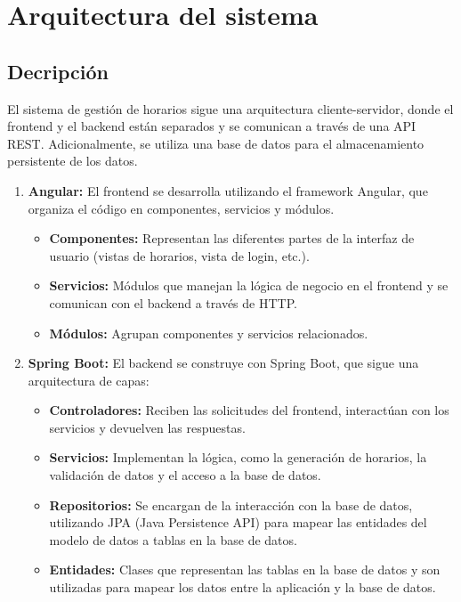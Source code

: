 \documentclass{article} %
\begin{document}
    \section{Arquitectura del sistema}
    \subsection{Decripción}
    \noindent El sistema de gestión de horarios sigue una arquitectura cliente-servidor, donde el frontend y el backend están separados y se comunican a través de una API REST. Adicionalmente, se utiliza una base de datos para el almacenamiento persistente de los datos.
    
    \begin{enumerate}[font=\bfseries]
            \item \textbf{Angular:} El frontend se desarrolla utilizando el framework Angular, que organiza el código en componentes, servicios y módulos.            
            \begin{itemize}
                \item \textbf{Componentes:} Representan las diferentes partes de la interfaz de usuario (vistas de horarios, vista de login, etc.).
                \item \textbf{Servicios:} Módulos que manejan la lógica de negocio en el frontend y se comunican con el backend a través de HTTP.
                \item \textbf{Módulos:} Agrupan componentes y servicios relacionados.
            \end{itemize}
        
            \item \textbf{Spring Boot:} El backend se construye con Spring Boot, que sigue una arquitectura de capas:
            \begin{itemize}
                \item \textbf{Controladores:} Reciben las solicitudes del frontend, interactúan con los servicios y devuelven las respuestas.
                \item \textbf{Servicios:} Implementan la lógica, como la generación de horarios, la validación de datos y el acceso a la base de datos.
                \item \textbf{Repositorios:} Se encargan de la interacción con la base de datos, utilizando JPA (Java Persistence API) para mapear las entidades del modelo de datos a tablas en la base de datos.
                \item \textbf{Entidades:} Clases que representan las tablas en la base de datos y son utilizadas para mapear los datos entre la aplicación y la base de datos.
            \end{itemize}
        

\end{enumerate}
\end{document}

